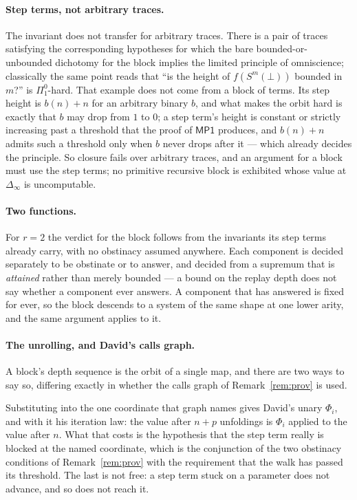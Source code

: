 \documentclass[11pt]{article}
\newcommand{\MP}{\mathsf{MP1}}
\theoremstyle{definition}
\begin{document}
\paragraph{Step terms, not arbitrary traces.} The invariant does not
transfer for arbitrary traces. There is a pair of traces satisfying the
corresponding hypotheses for which the bare bounded-or-unbounded
dichotomy for the block implies the limited principle of omniscience;
classically the same point reads that ``is the height of $f(S^m(\bot))$
bounded in $m$?'' is $\Pi^0_1$-hard. That example does not come from a
block of terms. Its step height is $b(n)+n$ for an arbitrary binary $b$,
and what makes the orbit hard is exactly that $b$ may drop from $1$ to
$0$; a step term's height is constant or strictly increasing past a
threshold that the proof of $\MP$ produces, and $b(n)+n$ admits such a
threshold only when $b$ never drops after it --- which already decides the
principle. So closure fails over arbitrary traces, and an argument for a
block must use the step terms; no primitive recursive block is exhibited
whose value at $\Delta_\infty$ is uncomputable.

\paragraph{Two functions.} For $r = 2$ the verdict for the block follows
from the invariants its step terms already carry, with no obstinacy
assumed anywhere. Each component is decided separately to be obstinate or
to answer, and decided from a supremum that is \emph{attained} rather than
merely bounded --- a bound on the replay depth does not say whether a
component ever answers. A component that has answered is fixed for ever,
so the block descends to a system of the same shape at one lower arity,
and the same argument applies to it.

\paragraph{The unrolling, and David's calls graph.} A block's depth
sequence is the orbit of a single map, and there are two ways to say so,
differing exactly in whether the calls graph of Remark~\ref{rem:prov} is
used.

Substituting into the one coordinate that graph names gives David's unary
$\Phi_i$, and with it his iteration law: the value after $n+p$ unfoldings
is $\Phi_i$ applied to the value after $n$. What that costs is the
hypothesis that the step term really is blocked at the named coordinate,
which is the conjunction of the two obstinacy conditions of
Remark~\ref{rem:prov} with the requirement that the walk has passed its
threshold. The last is not free: a step term stuck on a parameter does not
advance, and so does not reach it.
\end{document}
